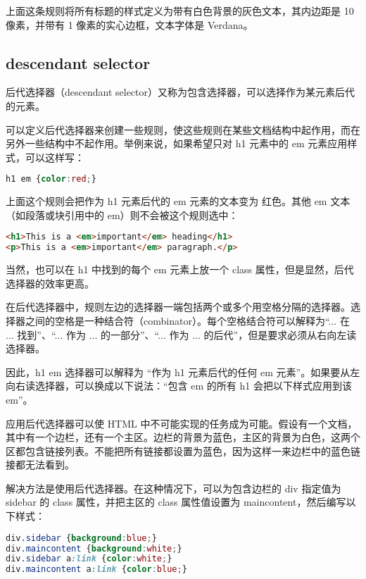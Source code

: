 上面这条规则将所有标题的样式定义为带有白色背景的灰色文本，其内边距是 10 像素，并带有 1 像素的实心边框，文本字体是 Verdana。

\subsection{descendant selector}


后代选择器（descendant selector）又称为包含选择器，可以选择作为某元素后代的元素。

可以定义后代选择器来创建一些规则，使这些规则在某些文档结构中起作用，而在另外一些结构中不起作用。举例来说，如果希望只对 h1 元素中的 em 元素应用样式，可以这样写：



\begin{lstlisting}[language=CSS]
h1 em {color:red;}
\end{lstlisting}

上面这个规则会把作为 h1 元素后代的 em 元素的文本变为 红色。其他 em 文本（如段落或块引用中的 em）则不会被这个规则选中：


\begin{lstlisting}[language=HTML]
<h1>This is a <em>important</em> heading</h1>
<p>This is a <em>important</em> paragraph.</p>
\end{lstlisting}

当然，也可以在 h1 中找到的每个 em 元素上放一个 class 属性，但是显然，后代选择器的效率更高。


在后代选择器中，规则左边的选择器一端包括两个或多个用空格分隔的选择器。选择器之间的空格是一种结合符（combinator）。每个空格结合符可以解释为“... 在 ... 找到”、“... 作为 ... 的一部分”、“... 作为 ... 的后代”，但是要求必须从右向左读选择器。

因此，h1 em 选择器可以解释为 “作为 h1 元素后代的任何 em 元素”。如果要从左向右读选择器，可以换成以下说法：“包含 em 的所有 h1 会把以下样式应用到该 em”。

应用后代选择器可以使 HTML 中不可能实现的任务成为可能。假设有一个文档，其中有一个边栏，还有一个主区。边栏的背景为蓝色，主区的背景为白色，这两个区都包含链接列表。不能把所有链接都设置为蓝色，因为这样一来边栏中的蓝色链接都无法看到。


解决方法是使用后代选择器。在这种情况下，可以为包含边栏的 div 指定值为 sidebar 的 class 属性，并把主区的 class 属性值设置为 maincontent，然后编写以下样式：

\begin{lstlisting}[language=CSS]
div.sidebar {background:blue;}
div.maincontent {background:white;}
div.sidebar a:link {color:white;}
div.maincontent a:link {color:blue;}
\end{lstlisting}

